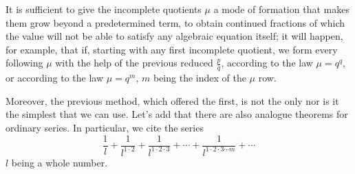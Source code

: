 \documentclass{article}
\begin{document}
\begin{displayquote}
	It is sufficient to give the incomplete quotients $\mu$ a mode of formation
	that makes them grow beyond a predetermined term, to obtain continued
	fractions of which the value will not be able to satisfy any algebraic
	equation itself; it will happen, for example, that if, starting with any first
	incomplete quotient, we form every following $\mu$ with the help of the
	previous reduced $\frac{p}{q}$, according to the law $\mu = q^q$, or according
	to the law $\mu = q^m$, $m$  being the index of the $\mu$ row.

	Moreover, the previous method, which offered the first, is not the only nor
	is it the simplest that we can use. Let’s add that there are also analogue
	theorems for ordinary series. In particular, we cite the series
	$$\frac{1}{l} + \frac{1}{l^{1 \cdot 2}} + \frac{1}{l^{1\cdot 2\cdot 3}}
		+ \cdots + \frac{1}{l^{1\cdot 2\cdot 3\cdots m}} + \cdots$$
	$l$ being a whole number.
\end{displayquote}
\end{document}
